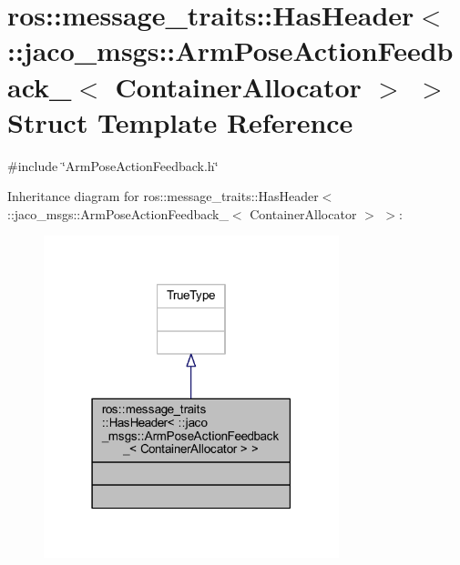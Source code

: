 \hypertarget{structros_1_1message__traits_1_1HasHeader_3_01_1_1jaco__msgs_1_1ArmPoseActionFeedback___3_01ContainerAllocator_01_4_01_4}{}\section{ros\+:\+:message\+\_\+traits\+:\+:Has\+Header$<$ \+:\+:jaco\+\_\+msgs\+:\+:Arm\+Pose\+Action\+Feedback\+\_\+$<$ Container\+Allocator $>$ $>$ Struct Template Reference}
\label{structros_1_1message__traits_1_1HasHeader_3_01_1_1jaco__msgs_1_1ArmPoseActionFeedback___3_01ContainerAllocator_01_4_01_4}


{\ttfamily \#include \char`\"{}Arm\+Pose\+Action\+Feedback.\+h\char`\"{}}



Inheritance diagram for ros\+:\+:message\+\_\+traits\+:\+:Has\+Header$<$ \+:\+:jaco\+\_\+msgs\+:\+:Arm\+Pose\+Action\+Feedback\+\_\+$<$ Container\+Allocator $>$ $>$\+:
\nopagebreak
\begin{figure}[H]
\begin{center}
\leavevmode
\includegraphics[width=243pt]{d8/d42/structros_1_1message__traits_1_1HasHeader_3_01_1_1jaco__msgs_1_1ArmPoseActionFeedback___3_01Contad5243ea1a5a8cd22f268449cbb57191}
\end{center}
\end{figure}


